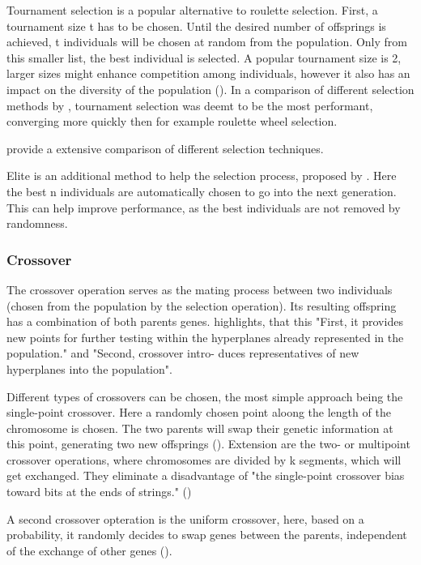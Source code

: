 Tournament selection is a popular alternative to roulette selection. First, a tournament size t has to be chosen. Until the desired number of offsprings is achieved, t individuals will be chosen at random from the population. Only from this smaller list, the best individual is selected. A popular tournament size is 2, larger sizes might enhance competition among individuals, however it also has an impact on the diversity of the population (\cite{hussain_trade-off_2020}). In a comparison of different selection methods by \cite{jinghui_zhong_comparison_2005}, tournament selection was deemt to be the most performant, converging more quickly then for example roulette wheel selection.

\cite{hussain_trade-off_2020} provide a extensive comparison of different selection techniques.

Elite is an additional method to help the selection process, proposed by \cite{de_jong_analysis_1975}. Here the best n individuals are automatically chosen to go into the next generation. This can help improve performance, as the best individuals are not removed by randomness.


\subsubsection{Crossover}
The crossover operation serves as the mating process between two individuals (chosen from the population by the selection operation). Its resulting offspring has a combination of both parents genes. \cite{grefenstette_optimization_1986} highlights, that this "First, it provides new points for further testing within the hyperplanes already represented in the population." and "Second, crossover intro- duces representatives of new hyperplanes into the population". 

Different types of crossovers can be chosen, the most simple approach being the single-point crossover. Here a randomly chosen point aloong the length of the chromosome is chosen. The two parents will swap their genetic information at this point, generating two new offsprings (\cite{katoch_review_2021}). Extension are the two- or multipoint crossover operations, where chromosomes are divided by k segments, which will get exchanged. They eliminate a disadvantage of "the single-point crossover bias toward bits at the ends of strings." (\cite{srinivas_genetic_1994})

A second crossover opteration is the uniform crossover, here, based on a probability, it randomly decides to swap genes between the parents, independent of the exchange of other genes (\cite{katoch_review_2021}). 

